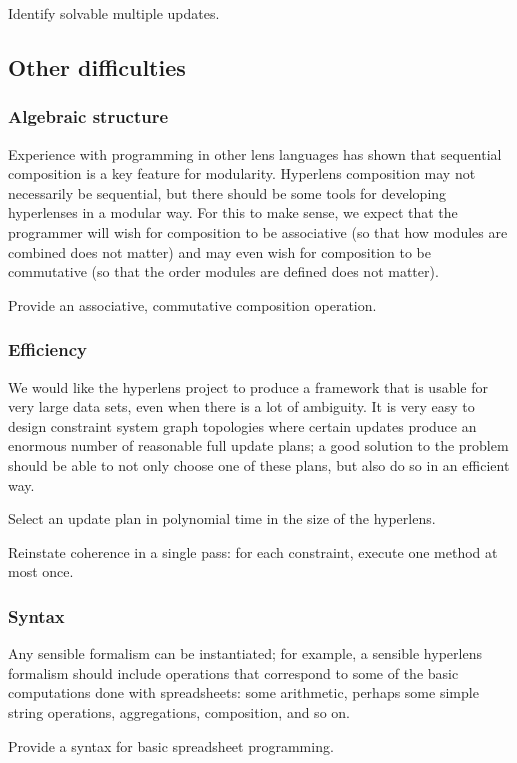 \begin{desiderata}
    Identify solvable multiple updates.
\end{desiderata}

\subsection{Other difficulties}
\subsubsection{Algebraic structure}
Experience with programming in other lens languages has shown that
sequential composition is a key feature for modularity. Hyperlens
composition may not necessarily be sequential, but there should be some
tools for developing hyperlenses in a modular way. For this to make sense,
we expect that the programmer will wish for composition to be associative
(so that how modules are combined does not matter) and may even wish for
composition to be commutative (so that the order modules are defined does
not matter).
\begin{desiderata}
    Provide an associative, commutative composition operation.
\end{desiderata}
\subsubsection{Efficiency}
We would like the hyperlens project to produce a framework that is usable
for very large data sets, even when there is a lot of ambiguity. It is very
easy to design constraint system graph topologies where certain updates
produce an enormous number of reasonable full update plans; a good solution
to the problem should be able to not only choose one of these plans, but
also do so in an efficient way.
\begin{desiderata}
    Select an update plan in polynomial time in the size of the hyperlens.
\end{desiderata}
\begin{desiderata}
    Reinstate coherence in a single pass: for each constraint, execute one
    method at most once.
\end{desiderata}
\subsubsection{Syntax}
Any sensible formalism can be instantiated; for example, a sensible
hyperlens formalism should include operations that correspond to some of the
basic computations done with spreadsheets: some arithmetic, perhaps some
simple string operations, aggregations, composition, and so on.
\begin{desiderata}
    Provide a syntax for basic spreadsheet programming.
\end{desiderata}

